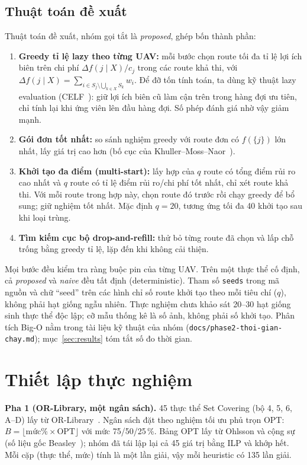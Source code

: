 \documentclass[conference]{IEEEtran}
\begin{document}
\subsection{Thuật toán đề xuất}
Thuật toán đề xuất, nhóm gọi tắt là \emph{proposed}, ghép bốn thành phần:
\begin{enumerate}
\item \textbf{Greedy tỉ lệ lazy theo từng UAV:} mỗi bước chọn route
tối đa tỉ lệ lợi ích biên trên chi phí $\Delta f(j\mid X)/c_j$ trong các route khả thi,
với $\Delta f(j\mid X)=\sum_{i\in S_j\setminus\bigcup_{k\in X}S_k}w_i$. Để
đỡ tốn tính toán, ta dùng kỹ thuật lazy evaluation (CELF~\cite{leskovec2007}): giữ lợi ích
biên cũ làm cận trên trong hàng đợi ưu tiên, chỉ tính lại khi ứng viên lên đầu hàng đợi. Số phép
đánh giá nhờ vậy giảm mạnh.
\item \textbf{Gói đơn tốt nhất:} so sánh nghiệm greedy với route đơn có $f(\{j\})$ lớn nhất,
lấy giá trị cao hơn (bố cục của Khuller--Moss--Naor~\cite{khuller1999}).
\item \textbf{Khởi tạo đa điểm (multi-start):} lấy hợp của $q$ route có tổng điểm rủi ro
cao nhất và $q$ route có tỉ lệ điểm rủi ro/chi phí tốt nhất, chỉ xét route khả thi.
Với mỗi route trong hợp này, chọn route đó trước rồi chạy greedy để bổ sung; giữ nghiệm
tốt nhất. Mặc định $q=20$, tương ứng tối đa 40 khởi tạo sau khi loại trùng.
\item \textbf{Tìm kiếm cục bộ drop-and-refill:} thử bỏ từng route đã chọn và lấp chỗ trống
bằng greedy tỉ lệ, lặp đến khi không cải thiện.
\end{enumerate}
Mọi bước đều kiểm tra ràng buộc pin của từng UAV. Trên một thực thể cố định, cả
\emph{proposed} và \emph{naive} đều tất định (deterministic). Tham số \texttt{seeds}
trong mã nguồn và chữ ``seed'' trên các hình chỉ số route khởi tạo theo mỗi tiêu chí
($q$), không phải hạt giống ngẫu nhiên. Thực nghiệm chưa khảo sát 20--30 hạt giống sinh
thực thể độc lập; cỡ mẫu thống kê là số ảnh, không phải số khởi tạo.
Phân tích Big-O nằm trong tài liệu kỹ thuật của nhóm
(\texttt{docs/phase2-thoi-gian-chay.md}); mục~\ref{sec:results} tóm tắt số đo thời gian.

\section{Thiết lập thực nghiệm}
\label{sec:setup}
\textbf{Pha 1 (OR-Library, một ngân sách).} 45 thực thể Set Covering (bộ 4, 5, 6, A--D)
lấy từ OR-Library~\cite{beasley1990}. Ngân sách đặt theo nghiệm tối ưu phủ trọn OPT:
$B = \lfloor \text{mức\%} \times \mathrm{OPT} \rfloor$ với mức 75/50/25\,\%. Bảng OPT lấy từ
Ohlsson và cộng sự~\cite{ohlsson1999} (số liệu gốc Beasley~\cite{beasley1987}); nhóm đã tái
lập lại cả 45 giá trị bằng ILP và khớp hết. Mỗi cặp (thực thể, mức) tính là một lần giải,
vậy mỗi heuristic có 135 lần giải.
\end{document}
